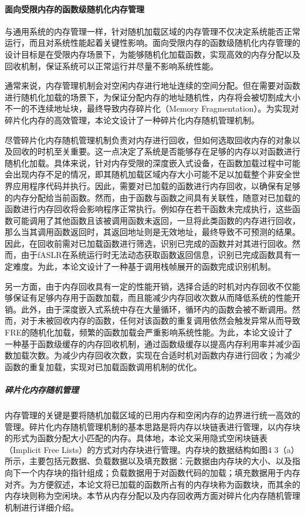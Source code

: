 \documentclass[12pt,a4paper]{ctexart}
\numberwithin{figure}{section}
\begin{document}
\paragraph{面向受限内存的函数级随机化内存管理}
\par 与通用系统的内存管理一样，针对随机加载区域的内存管理不仅决定系统能否正常运行，而且对系统性能起着关键性影响。面向受限内存的函数级随机化内存管理的设计目标是在受限内存场景下，为能够随机化加载函数，实现高效的内存分配以及回收机制，保证系统可以正常运行并尽量不影响系统性能。
\par 通常来说，内存管理机制会对空闲内存进行地址连续的空间分配。但在需要对函数进行随机化加载的场景下，为保证分配内存的地址随机性，内存将会被切割成大小不一的不连续地址块，最终导致内存碎片化（Memory Fragmentation）。为实现对碎片化内存的高效管理，本论文设计了一种碎片化内存随机管理机制。
\par 尽管碎片化内存随机管理机制负责对内存进行回收，但如何选取回收内存的对象以及回收的时机至关重要。这一点决定了系统是否能够存在足够的内存以对函数进行随机化加载。具体来说，针对内存受限的深度嵌入式设备，在函数加载过程中可能会出现内存不足的情况，即其随机加载区域内存大小可能不足以加载整个非安全世界应用程序代码并执行。因此，需要对已加载的函数进行内存回收，以确保有足够的内存分配给当前函数。然而，由于函数与函数之间具有关联性，随意对已加载的函数进行内存回收将会影响程序正常执行。例如存在若干函数未完成执行，这些函数可能调用了其他函数且该被调用函数未返回，一旦将此类函数的内存进行回收，那么当其调用函数返回时，其返回地址则是无效地址，最终导致不可预测的结果。因此，在回收前需对已加载函数进行筛选，识别已完成的函数并对其进行回收。然而，由于fASLR在系统运行时无法动态获取函数返回信息，识别已完成函数具有一定难度。为此，本论文设计了一种基于调用栈帧展开的函数完成识别机制。
\par 另一方面，由于内存回收具有一定的性能开销，选择合适的时机对内存回收不仅能够保证有足够内存用于函数加载，而且能减少内存回收次数从而降低系统的性能开销。此外，由于深度嵌入式系统中存在大量循环，循环内的函数会被不断调用。然而，对于未被回收内存的函数，任何对该函数的重复调用依然会触发异常从而导致FRE的随机化加载，频繁的函数加载会严重影响系统性能。为此，本论文设计了一种基于函数级缓存的内存回收机制，通过函数级缓存以提高内存利用率并减少函数加载次数。为减少内存回收次数，实现在合适时机对函数内存进行回收；为减少函数的重复加载，实现对已加载函数调用机制的优化。
\subparagraph{碎片化内存随机管理}
\par 内存管理的关键是要将随机加载区域的已用内存和空闲内存的边界进行统一高效的管理。碎片化内存随机管理机制的基本思路是将内存以块链表进行管理，以内存块的形式为函数分配大小匹配的内存。具体地，本论文采用隐式空闲块链表（Implicit Free Lists）的方式对内存块进行管理。内存块的数据结构如图4 3（a）所示，主要包括元数据、负载数据以及填充数据：元数据由内存块的大小、以及指向下一个内存块的指针组成；负载数据用于对函数代码的加载；填充数据用于内存对齐。为方便叙述，本论文将已加载的函数所占有的内存块称为函数块，而其余的内存块则称为空闲块。本节从内存分配以及内存回收两方面对碎片化内存随机管理机制进行详细介绍。
\end{document}
